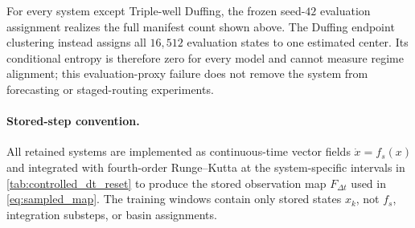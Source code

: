 \begin{table}[tbp]
\centering
\caption{Stored observation intervals and base reset laws. Each coordinate is
sampled independently and uniformly over the listed box; one stored step is one
fourth-order Runge--Kutta update.}
\label{tab:controlled_dt_reset}
\end{table}

For every system except Triple-well Duffing, the frozen seed-\(42\) evaluation
assignment realizes the full manifest count shown above.  The Duffing endpoint
clustering instead assigns all \(16{,}512\) evaluation states to one estimated
center.  Its conditional entropy is therefore zero for every model and cannot
measure regime alignment; this evaluation-proxy failure does not remove the
system from forecasting or staged-routing experiments.

\paragraph{Stored-step convention.}
All retained systems are implemented as continuous-time vector fields
\(\dot x=f_s(x)\) and integrated with fourth-order Runge--Kutta at the
system-specific intervals in \cref{tab:controlled_dt_reset} to produce the
stored observation map \(F_{\Delta t}\) used in \cref{eq:sampled_map}. The
training windows contain only stored states \(x_k\), not \(f_s\), integration
substeps, or basin assignments.


